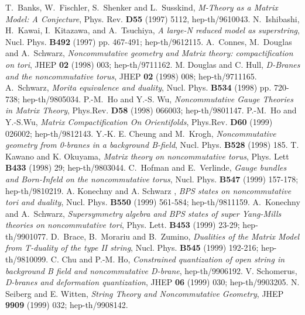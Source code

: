 \documentclass[a4paper,a4paper]{article}
\begin{document}
{\begin{thebibliography}{99}
 T.~Banks, W.~Fischler, S.~Shenker and L.~Susskind, {\it M-Theory as a
Matrix Model: A Conjecture}, Phys. Rev. {\bf D55} (1997) 5112, hep-th/9610043.
 N.~Ishibashi, H.~Kawai, I.~Kitazawa, and A.~Tsuchiya, 
{\it A large-N reduced model as superstring}, Nucl. Phys. {\bf B492} (1997) 
pp. 467-491; hep-th/9612115. 
 A.~Connes, M.~Douglas and A.~Schwarz, {\it Noncommutative geometry and Matrix
theory: compactification on tori}, JHEP {\bf 02} (1998) 003; hep-th/9711162.
 M. Douglas and C. Hull, {\it D-Branes and the noncommutative torus}, JHEP {\bf 02} (1998) 008; 
hep-th/9711165. 
 A.~Schwarz, {\it Morita equivalence and duality}, Nucl. Phys. {\bf B534} (1998) 
pp. 720-738; hep-th/9805034.
 P.-M.~Ho and Y.-S. Wu, {\it Noncommutative Gauge Theories in Matrix Theory}, 
Phys.Rev. {\bf D58} (1998) 066003; hep-th/9801147.
 P.-M.~Ho and Y.-S.Wu, {\it Matrix Compactification On Orientifolds}, Phys.Rev. {\bf D60} (1999) 026002; hep-th/9812143.
 Y.-K. E. Cheung and M.~Krogh, {\it Noncommutative geometry from 0-branes in a background B-field}, 
Nucl. Phys. {\bf B528} (1998) 185.
 T. Kawano and K. Okuyama, {\it Matrix theory on noncommutative torus}, Phys. Lett {\bf B433 } (1998) 29; 
hep-th/9803044.
 C.~Hofman and E.~Verlinde, {\it Gauge bundles and Born-Infeld on the noncommutative torus}, 
Nucl. Phys. {\bf B547} (1999) 157-178; hep-th/9810219.
 A. Konechny and A. Schwarz , {\it BPS states on noncommutative
tori and duality}, Nucl. Phys. {\bf B550} (1999) 561-584; hep-th/9811159.
 A.~Konechny and A.~Schwarz, {\it Supersymmetry algebra and BPS states of 
super Yang-Mills theories on noncommutative tori},  Phys. Lett. {\bf B453} (1999) 23-29; hep-th/9901077.
 D.~Brace, B.~Morariu  and  B.~Zumino, {\it Dualities of the Matrix Model from T-duality of 
the type II string}, Nucl. Phys. {\bf B545} (1999) 192-216; hep-th/9810099.
 C. Chu and P.-M. Ho, {\it Constrained quantization of open string in background B field and 
noncommutative D-brane}, hep-th/9906192.
 V. Schomerus, {\it D-branes and deformation quantization}, JHEP {\bf 06} (1999) 030; hep-th/9903205. 
 N. Seiberg and E. Witten, {\it String Theory and Noncommutative Geometry}, JHEP {\bf 9909} (1999) 032; 
hep-th/9908142. 



\end{thebibliography}}
\end{document}
